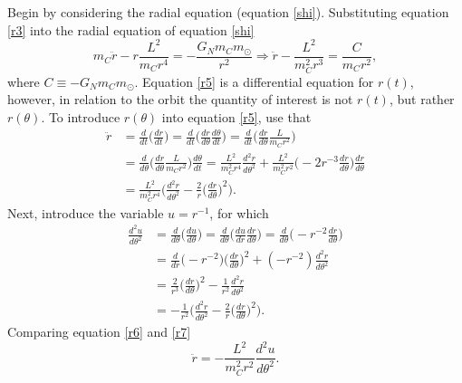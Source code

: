 \begin{example}
\begin{enumerate}
		Begin by considering the radial equation (equation \eqref{shi}). Substituting equation \eqref{r3} into the radial equation of equation \eqref{shi}
		\begin{equation}
			m_C\ddot{r}-r\frac{L^2}{m_Cr^4}=-\frac{G_Nm_Cm_\odot}{r^2}\Rightarrow \ddot{r}-\frac{L^2}{m_C^2r^3}=\frac{C}{m_Cr^2},
			\label{r5}
		\end{equation} 
		where $C\equiv-G_Nm_Cm_\odot$. Equation \eqref{r5} is a differential equation for $r(t)$, however, in relation to the orbit the quantity of interest is not $r(t)$, but rather $r(\theta)$. To introduce $r(\theta)$ into equation \eqref{r5}, use that
		\begin{equation}
			\begin{split}
				\ddot{r}&=\frac{d}{dt}\bigg(\frac{dr}{dt}\bigg)=\frac{d}{dt}\bigg(\frac{dr}{d\theta}\frac{d\theta}{dt}\bigg)=\frac{d}{dt}\bigg(\frac{dr}{d\theta}\frac{L}{m_Cr^2}\bigg)\\
				&=\frac{d}{d\theta}\bigg(\frac{dr}{d\theta}\frac{L}{m_Cr^2}\bigg)\frac{d\theta}{dt}=\frac{L^2}{m_C^2r^4}\frac{d^2r}{d\theta^2}+\frac{L^2}{m_C^2r^2}\bigg(-2r^{-3}\frac{dr}{d\theta}\bigg)\frac{dr}{d\theta}\\
				&=\frac{L^2}{m_C^2r^4}\bigg(\frac{d^2r}{d\theta^2}-\frac{2}{r}\bigg(\frac{dr}{d\theta}\bigg)^2\bigg).
			\end{split}
			\label{r6}
		\end{equation} 
		Next, introduce the variable $u=r^{-1}$, for which
		\begin{equation}
			\begin{split}
				\frac{d^2u}{d\theta^2}&=\frac{d}{d\theta}\bigg(\frac{du}{d\theta}\bigg)=\frac{d}{d\theta}\bigg(\frac{du}{dr}\frac{dr}{d\theta}\bigg)=\frac{d}{d\theta}\bigg(-r^{-2}\frac{dr}{d\theta}\bigg)\\
				&=\frac{d}{dr}\bigg(-r^{-2}\bigg)\bigg(\frac{dr}{d\theta}\bigg)^2+(-r^{-2})\frac{d^2r}{d\theta^2}\\
				&=\frac{2}{r^3}\bigg(\frac{dr}{d\theta}\bigg)^2-\frac{1}{r^2}\frac{d^2r}{d\theta^2}\\
				&=-\frac{1}{r^2}\bigg(\frac{d^2r}{d\theta^2}-\frac{2}{r}\bigg(\frac{dr}{d\theta}\bigg)^2\bigg).
			\end{split}
			\label{r7}
		\end{equation} 
		Comparing equation \eqref{r6} and \eqref{r7}
		\begin{equation}
			\ddot{r}=-\frac{L^2}{m_C^2r^2}\frac{d^2u}{d\theta^2}.
			\label{r8}
		\end{equation} 

\end{enumerate}
\end{example}
